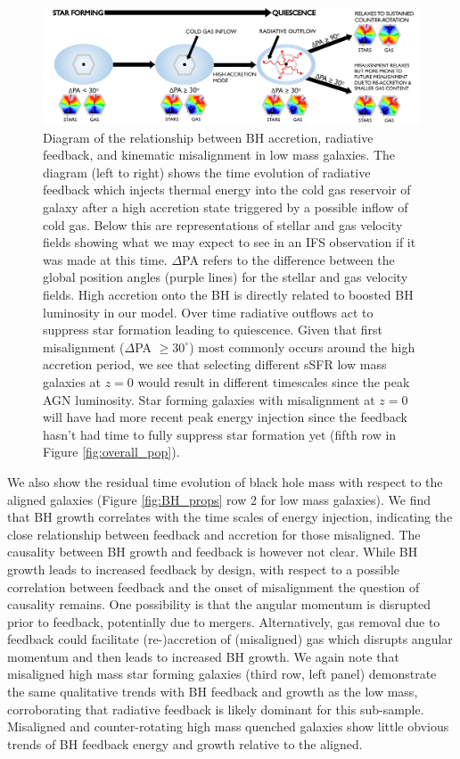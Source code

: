 \begin{landscape}
\begin{figure}
	\includegraphics[width=\linewidth]{misalignment_BH/quasar_mode_feedback_compressed.pdf}
    \caption{Diagram of the relationship between BH accretion, radiative feedback, and kinematic misalignment in low mass galaxies. The diagram (left to right) shows the time evolution of radiative feedback which injects thermal energy into the cold gas reservoir of galaxy after a high accretion state triggered by a possible inflow of cold gas. Below this are representations of stellar and gas velocity fields showing what we may expect to see in an IFS observation if it was made at this time. $\Delta$PA refers to the difference between the global position angles (purple lines) for the stellar and gas velocity fields. High accretion onto the BH is directly related to boosted BH luminosity in our model. Over time radiative outflows act to suppress star formation leading to quiescence. Given that first misalignment ($\Delta$PA $\geq 30^{\circ}$) most commonly occurs around the high accretion period, we see that selecting different sSFR low mass galaxies at $z=0$ would result in different timescales since the peak AGN luminosity. Star forming galaxies with misalignment at $z=0$ will have had more recent peak energy injection since the feedback hasn't had time to fully suppress star formation yet (fifth row in Figure \ref{fig:overall_pop}).}
    \label{fig:diagram}
\end{figure}
\end{landscape}

We also show the residual time evolution of black hole mass with respect to the aligned galaxies (Figure \ref{fig:BH_props} row 2 for low mass galaxies). We find that BH growth correlates with the time scales of energy injection, indicating the close relationship between feedback and accretion for those misaligned. The causality between BH growth and feedback is however not clear. While BH growth leads to increased feedback by design, with respect to a possible correlation between feedback and the onset of misalignment the question of causality remains. One possibility is that the angular momentum is disrupted prior to feedback, potentially due to mergers. Alternatively, gas removal due to feedback could facilitate (re-)accretion of (misaligned) gas which disrupts angular momentum and then leads to increased BH growth. We again note that misaligned high mass star forming galaxies (third row, left panel) demonstrate the same qualitative trends with BH feedback and growth as the low mass, corroborating that radiative feedback is likely dominant for this sub-sample. Misaligned and counter-rotating high mass quenched galaxies show little obvious trends of BH feedback energy and growth relative to the aligned.

